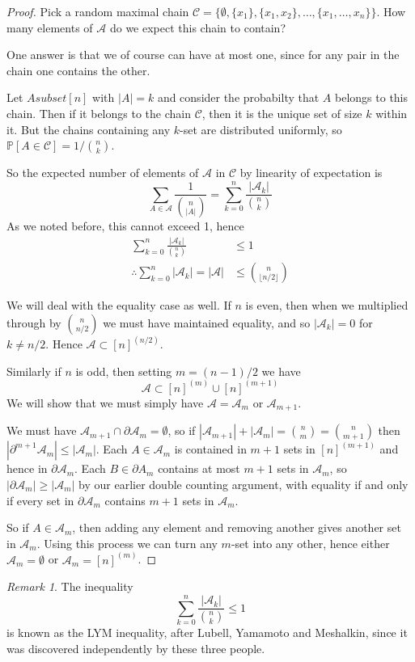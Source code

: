 \documentclass[]{article}
\theoremstyle{custhm}
\theoremstyle{cusdef}
\theoremstyle{custhm}
\theoremstyle{custhm}
\theoremstyle{custhm}
\theoremstyle{custhm}
\theoremstyle{cusdef}
\theoremstyle{remark}
\newtheorem*{remark*}{Remark}
\renewcommand{\P}{\mathbb{P}}
\newcommand{\A}{\mathcal{A}}
\begin{document}
\begin{proof}
Pick a random maximal chain $\mathcal{C} = \{\emptyset, \{x_1\},\{x_1,x_2\},\dots,\{x_1,\dots,x_n\}\}$. How many elements of $\A$ do we expect this chain to contain?

One answer is that we of course can have at most one, since for any pair in the chain one contains the other.

Let $Asubset [n]$ with $|A| = k$ and consider the probabilty that $A$ belongs to this chain. Then if it belongs to the chain $\mathcal{C}$, then it is the unique set of size $k$ within it. But the chains containing any $k$-set are distributed uniformly, so $\P[A\in\mathcal{C}] = 1/{n\choose k}$.

So the expected number of elements of $\A$ in $\mathcal{C}$ by linearity of expectation is
\[
\sum_{A\in\A}\frac{1}{{n\choose |A|}} = \sum_{k=0}^{n} \frac{|\A_k|}{{n\choose k}}
\]
As we noted before, this cannot exceed 1, hence
\begin{align*}
	\sum_{k=0}^{n} \frac{|\A_k|}{\binom{n}{k}}&\le 1\\
	\therefore \sum_{k=0}^{n}|\A_k| = |\A| &\le \binom{n}{\lfloor n/2\rfloor}
\end{align*}

We will deal with the equality case as well. If $n$ is even, then when we multiplied through by $\binom{n}{n/2}$ we must have maintained equality, and so $|\A_k| = 0$ for $k \ne n/2$. Hence $\A \subset [n]^{(n/2)}$.

Similarly if $n$ is odd, then setting $m = (n-1)/2$ we have
\[
\A\subset [n]^{(m)} \cup[n]^{(m+1)}
\]
We will show that we must simply have $\A = \A_m$ or $\A_{m+1}$.

We must have $\A_{m+1}\cap\partial \A_m = \emptyset$, so if $|\A_{m+1}| + |\A_m| = \binom{n}{m} = \binom{n}{m+1}$ then $|\partial^{m+1}\A_m|\le |\A_m|$. Each $A\in \A_m$ is contained in $m+1$ sets in $[n]^{(m+1)}$ and hence in $\partial \A_m$. Each $B\in \partial A_m$ contains at most $m+1$ sets in $\A_m$, so $|\partial \A_m| \ge |\A_m|$ by our earlier double counting argument, with equality if and only if every set in $\partial \A_m$ contains $m+1$ sets in $\A_m$.

So if $A \in \A_m$, then adding any element and removing another gives another set in $\A_m$. Using this process we can turn any $m$-set into any other, hence either $\A_m = \emptyset$ or $\A_m = [n]^{(m)}$.
\end{proof}

\begin{remark*}
The inequality
\[
\sum_{k=0}^{n} \frac{|\A_k|}{\binom{n}{k}} \le 1
\]
is known as the LYM inequality, after Lubell, Yamamoto and Meshalkin, since it was discovered independently by these three people.
\end{remark*}
\end{document}
